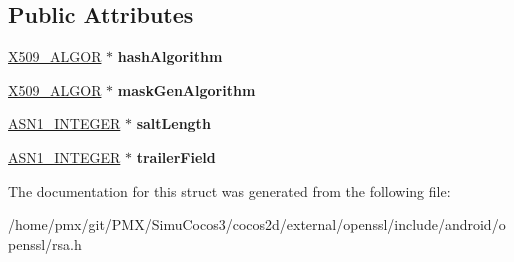 \subsection*{Public Attributes}
\begin{DoxyCompactItemize}
\item 
\mbox{\label{structrsa__pss__params__st_a7cf60f7686a19d9cf621c68b029da1f0}} 
\hyperlink{structX509__algor__st}{X509\+\_\+\+A\+L\+G\+OR} $\ast$ {\bfseries hash\+Algorithm}
\item 
\mbox{\label{structrsa__pss__params__st_a3d27162e7dbc63db4f86c3543f05c9a9}} 
\hyperlink{structX509__algor__st}{X509\+\_\+\+A\+L\+G\+OR} $\ast$ {\bfseries mask\+Gen\+Algorithm}
\item 
\mbox{\label{structrsa__pss__params__st_afd60b260837b156b58827fce5e4dc37d}} 
\hyperlink{structasn1__string__st}{A\+S\+N1\+\_\+\+I\+N\+T\+E\+G\+ER} $\ast$ {\bfseries salt\+Length}
\item 
\mbox{\label{structrsa__pss__params__st_a6c01cb6a6d165d2f0b6b96cbd35083a9}} 
\hyperlink{structasn1__string__st}{A\+S\+N1\+\_\+\+I\+N\+T\+E\+G\+ER} $\ast$ {\bfseries trailer\+Field}
\end{DoxyCompactItemize}


The documentation for this struct was generated from the following file\+:\begin{DoxyCompactItemize}
\item 
/home/pmx/git/\+P\+M\+X/\+Simu\+Cocos3/cocos2d/external/openssl/include/android/openssl/rsa.\+h\end{DoxyCompactItemize}
